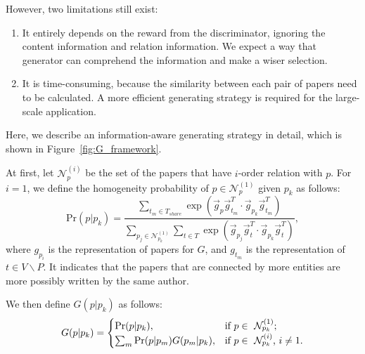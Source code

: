 \documentclass[letterpaper]{article} %
\begin{document}
However, two limitations still exist:
\begin{enumerate}
\item It entirely depends on the reward from the discriminator, ignoring the content information and relation information.
We expect a way that generator can comprehend the information and make a wiser selection.

\item  It is time-consuming, because the similarity between each pair of papers need to be calculated. A more efficient generating strategy is required for the large-scale application.

\end{enumerate}

Here, we describe an information-aware generating strategy in detail, which is shown in Figure~\ref{fig:G_framework}.

At first, let $\mathcal{N}_p^{(i)}$ be the set of the papers that have $i$-order relation with $p$.
For $i=1$, we define the homogeneity probability of $p \in \mathcal{N}_p^{(1)}$ given $p_k$ as follows:
\begin{equation}
\text{Pr}(p|p_k) = \frac{\sum_{t_m \in T_{share}}\exp(\vec{g}_{p}\vec{g}_{t_m}^T\cdot
\vec{g}_{p_k}\vec{g}_{t_m}^T)}{\sum_{p_j \in \mathcal{N}_{p_k}^{(1)}}\sum_{t \in T}
\exp(\vec{g}_{p_j}\vec{g}_{t}^T\cdot \vec{g}_{p_k}\vec{g}_{t}^T)},
\label{eq:pairwise}
\end{equation}
where $g_{p_i}$ is the representation of papers for $G$, and $g_{t_m}$ is the representation of $t \in V \backslash P$.
It indicates that the papers that are connected by more entities are more possibly written by the same author.

We then define $G(p|p_k)$ as follows:
{\small
\begin{align}
\centering
G(p|p_k) = \begin{cases} \text{Pr}(p|p_k), & \mbox{if } p \in \mbox{ $\mathcal{N}_{p_k}^{(1)}$}; \label{eq:G}
\\ \sum_m\text{Pr}(p|p_m)G(p_m|p_k), & \mbox{if } p \in \mbox{ $\mathcal{N}_{p_k}^{(i)}$, $i\neq 1$}.
\end{cases}
\end{align}}
\end{document}
